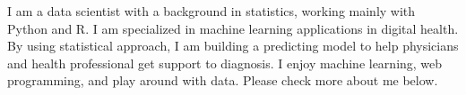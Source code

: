 %
%
%
\par{
I am a data scientist with a background in statistics, working mainly with Python and R. I am specialized in machine learning applications in digital health. By using statistical approach, I am building a predicting model to help physicians and health professional get support to diagnosis. I enjoy machine learning, web programming, and play around with data. Please check more about me below.
}